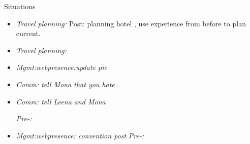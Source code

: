 \documentclass[serif, mathserif, final]{beamer}
\newcommand{\comments}[1]{}
\begin{document}
\begin{frame}{}
\begin{columns}
\begin{column}{0.20\linewidth}
\begin{block}{Situations}
\begin{itemize}
               \item \tiny \textit{Travel planning:} Post: planning
                 hotel , use experience from before to plan current. 

               \item \tiny \textit{Travel planning:} 

 

               \item \tiny \textit{Mgmt:webpresence:update pic} 

               
               \item \tiny \textit{Comm: tell Mona that you hate} 


               \item \tiny \textit{Comm: tell Leena and Mona} 
                 
                 \textit{Pre-:}
                 \comments{ 
                   
                  
                 } 
              
               \item \tiny \textit{Mgmt:webpresence: convention post} 
                 \textit{Pre-:}    
                 \comments{  
                   After such a nice convention, will we have a Maiytra 2016? 
                   After such a nice convention, will we have a Maiytra in 2016? 
                   
                   After such an amazing and wonderful convention, will we have
                   a Maiytra 2016?
                   
                   L0+L1: 1
                   L2+L3: 1
                   L4+L5: 1
                   
                   After such a great convention, will we have
                   a Maiytra in 2016? 
                            
                   L0+L1: 2
                   L2+L3: 1 
                   L4+L5: 1 
                   
                   motive: show people I'm interesting
                   gen. Intent: ask for information to committee
                   intent: ask if next year's event can happen. 
                   outcome: get people going on Maiytra
                   
                   After such a great convention, will we have Maiytra 2016? 
         
                   
                   L0+L1: 1
                   L2+L3: 1
                   L4+L5: 2
                   
}
\end{itemize}
\end{block}
\end{column}
\end{columns}
\end{frame}
\end{document}
